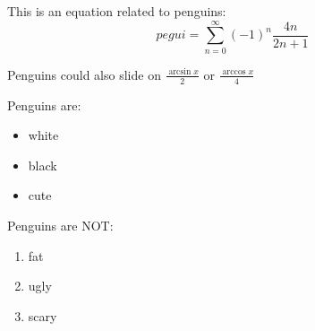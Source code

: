 This is an equation related to penguins:
\begin{equation}
    pegui = \sum_{n=0}^{\infty}(-1)^n \frac{4n}{2n+1}
\end{equation}

Penguins could also slide on $\frac{\arcsin{x}}{2}$ or $\frac{\arccos{x}}{4}$

Penguins are:
\begin{itemize}
    \item white
    \item black
    \item cute
\end{itemize}
Penguins are NOT:
\begin{enumerate}
    \item fat
    \item ugly
    \item scary
\end{enumerate}
